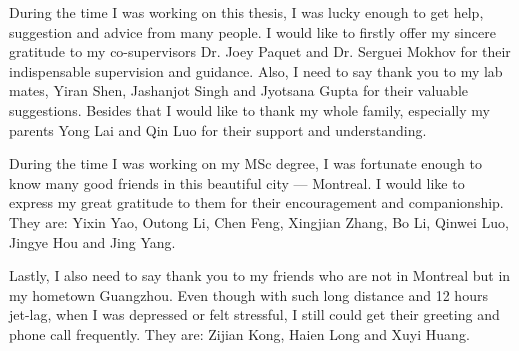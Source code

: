 
\begin{acknowledgments}
    
During the time I was working on this thesis, I was lucky enough to 
get help, suggestion and advice from many people. I would like to 
firstly offer my sincere gratitude to my co-supervisors Dr. Joey Paquet 
and Dr. Serguei Mokhov for their indispensable 
supervision and guidance. 
Also, I need to say thank you to my lab mates, Yiran Shen, Jashanjot 
Singh and Jyotsana Gupta for their valuable suggestions.
Besides that I would like to thank my whole family, especially my parents Yong
Lai and Qin Luo for their support and understanding.

During the time I was working on my MSc degree, I was fortunate enough to 
know many good friends in this beautiful city --- Montreal.
I would like to express my great gratitude to them for their 
encouragement and companionship. They are: Yixin Yao, Outong Li, 
Chen Feng, Xingjian Zhang, Bo Li, Qinwei Luo, Jingye Hou and Jing Yang.

Lastly, I also need to say thank you to my friends who are not in 
Montreal but in my hometown Guangzhou. Even though with such long distance and
12 hours jet-lag, when I was depressed or felt stressful, I still could
get their greeting and phone call frequently. They are: Zijian Kong,
Haien Long and Xuyi Huang.

\end{acknowledgments}
